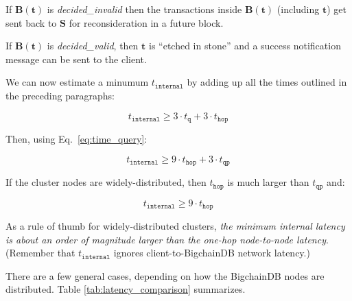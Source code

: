 If $\mathbf{B}(\mathbf{t})$ is \textsf{\textit{decided\_invalid}} then the transactions inside $\mathbf{B}(\mathbf{t})$ (including $\mathbf{t}$) get sent back to $\mathbf{S}$ for reconsideration in a future block.

If $\mathbf{B}(\mathbf{t})$ is \textsf{\textit{decided\_valid}}, then $\mathbf{t}$ is “etched in stone” and a success notification message can be sent to the client.

We can now estimate a minumum $t_\mathtt{internal}$ by adding up all the times outlined in the preceding paragraphs:

\begin{equation}
 t_\mathtt{internal} \ge 3 \cdot t_\mathtt{q} + 3 \cdot t_\mathtt{hop}
\end{equation}

Then, using Eq.~\eqref{eq:time_query}:

\begin{equation}
 t_\mathtt{internal} \ge 9 \cdot t_\mathtt{hop} + 3 \cdot t_\mathtt{qp} 
\end{equation}

If the cluster nodes are widely-distributed, then $t_\mathtt{hop}$ is much larger than $t_\mathtt{qp}$ and:

\begin{equation}
 t_\mathtt{internal} \ge 9 \cdot t_\mathtt{hop}
\end{equation}

As a rule of thumb for widely-distributed clusters, \textit{the minimum internal latency is about an order of magnitude larger than the one-hop node-to-node latency}. 
(Remember that $t_\mathtt{internal}$ ignores client-to-BigchainDB network latency.)

There are a few general cases, depending on how the BigchainDB nodes are distributed. Table \ref{tab:latency_comparison} summarizes.

